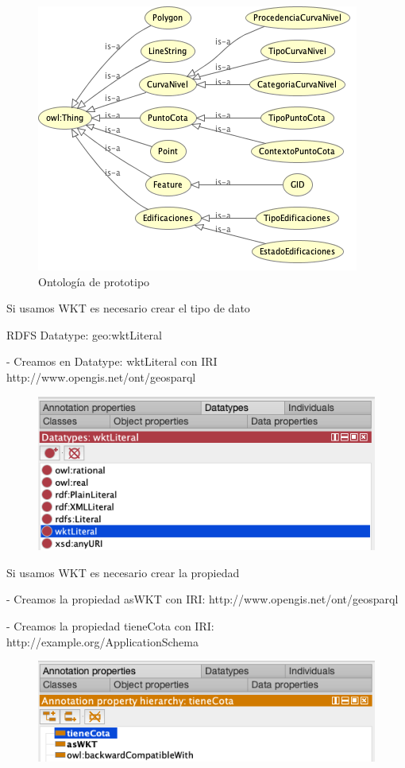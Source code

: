 \begin{figure}[H]
	\centering
	\includegraphics[width=0.7\linewidth]{imagenes/capitulo4/ontologia}
	\caption{Ontología de prototipo}
	\label{fig:ontologia}
\end{figure}

Si usamos WKT es necesario crear el tipo de dato

RDFS Datatype: geo:wktLiteral

- Creamos en Datatype: wktLiteral con IRI http://www.opengis.net/ont/geosparql

\begin{figure}[H]
	\centering
	\includegraphics[width=0.7\linewidth]{imagenes/capitulo4/datatype}
	\caption{}
	\label{fig:datatype}
\end{figure}

Si usamos WKT es necesario crear la propiedad


- Creamos la propiedad asWKT con IRI: http://www.opengis.net/ont/geosparql

- Creamos la propiedad tieneCota con IRI: http://example.org/ApplicationSchema

\begin{figure}[H]
	\centering
	\includegraphics[width=0.7\linewidth]{imagenes/capitulo4/propiedad}
	\caption{}
	\label{fig:propiedad}
\end{figure}


